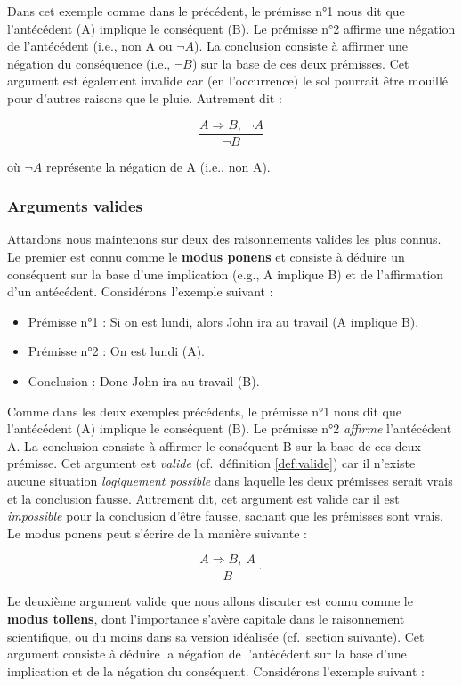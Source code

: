 \documentclass[
  a4paper,11pt,twoside,onecolumn,openright,final,oldfontcommands]{memoir}
\providecommand{\tightlist}{%
  \setlength{\itemsep}{0pt}\setlength{\parskip}{0pt}}
\theoremstyle{definition}
\theoremstyle{definition}
\theoremstyle{definition}
\theoremstyle{definition}
\theoremstyle{remark}
\begin{document}
Dans cet exemple comme dans le précédent, le prémisse n°1 nous dit que l'antécédent (A) implique le conséquent (B). Le prémisse n°2 affirme une négation de l'antécédent (i.e., non A ou \(\neg A\)). La conclusion consiste à affirmer une négation du conséquence (i.e., \(\neg B\)) sur la base de ces deux prémisses. Cet argument est également invalide car (en l'occurrence) le sol pourrait être mouillé pour d'autres raisons que le pluie. Autrement dit :

\[\dfrac{A \Rightarrow B, \ \neg A}{\neg B}\]

où \(\neg A\) représente la négation de A (i.e., non A).

\hypertarget{arguments-valides}{%
\subsubsection{Arguments valides}\label{arguments-valides}}

Attardons nous maintenons sur deux des raisonnements valides les plus connus. Le premier est connu comme le \textbf{modus ponens} et consiste à déduire un conséquent sur la base d'une implication (e.g., A implique B) et de l'affirmation d'un antécédent. Considérons l'exemple suivant :

\begin{itemize}
\tightlist
\item
  Prémisse n°1 : Si on est lundi, alors John ira au travail (A implique B).
\item
  Prémisse n°2 : On est lundi (A).
\item
  Conclusion : Donc John ira au travail (B).
\end{itemize}

Comme dans les deux exemples précédents, le prémisse n°1 nous dit que l'antécédent (A) implique le conséquent (B). Le prémisse n°2 \emph{affirme} l'antécédent A. La conclusion consiste à affirmer le conséquent B sur la base de ces deux prémisse. Cet argument est \emph{valide} (cf.~définition \ref{def:valide}) car il n'existe aucune situation \emph{logiquement possible} dans laquelle les deux prémisses serait vrais et la conclusion fausse. Autrement dit, cet argument est valide car il est \emph{impossible} pour la conclusion d'être fausse, sachant que les prémisses sont vrais. Le modus ponens peut s'écrire de la manière suivante :

\[\dfrac{A \Rightarrow B, \ A}{B} \cdot\]

Le deuxième argument valide que nous allons discuter est connu comme le \textbf{modus tollens}, dont l'importance s'avère capitale dans le raisonnement scientifique, ou du moins dans sa version idéalisée (cf.~section suivante). Cet argument consiste à déduire la négation de l'antécédent sur la base d'une implication et de la négation du conséquent. Considérons l'exemple suivant :
\end{document}
